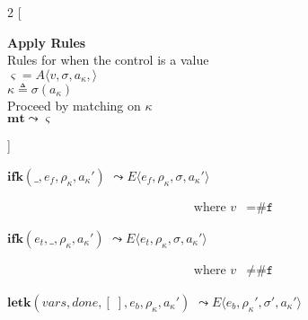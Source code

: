 \documentclass[12pt,draft]{article}
\newcommand{\falsesyn}{\texttt{\#f}}
\newcommand{\env}[0]{\rho}
\newcommand{\store}[0]{\sigma}
\newcommand{\kaddr}[0]{a_{\kappa}}
\newcommand{\kont}[0]{\kappa}
\newcommand{\state}[0]{\varsigma}
\newcommand{\E}[4]{E\langle #1 , #2 , #3 , #4 \rangle}
\newcommand{\A}[4]{A\langle #1 , #2 , #3 , #4 \rangle}
\begin{document}
\newpage

\newcommand{\kenv}[0]{\env_{\kappa}}
\newcommand{\lamenv}[0]{\env_{\lambda}}

\begin{multicols*}{2}
[
\begin{center}
\textbf{Apply Rules} \\
Rules for when the control is a value \\
$\state = \A{v}{\store}{\kaddr}{}$ \\
$\kont \triangleq \store(\kaddr)$ \\
Proceed by matching on $\kont$ \\
\vspace{5mm}
$\textbf{mt} \leadsto \state$
\end{center}
\vspace{-5mm}
]
\begin{center}
  $\textbf{ifk}(\_ , e_f , \kenv , \kaddr')$
  $\leadsto \E{e_f}{\kenv}{\store}{\kaddr'}$
\end{center}
\vspace{-7mm}
\begin{align*}
\text{where } v &= \falsesyn
\end{align*}
\begin{center}
  $\textbf{ifk}(e_t , \_ , \kenv, \kaddr')$
  $\leadsto \E{e_t}{\kenv}{\store}{\kaddr'}$
\end{center}
\vspace{-7mm}
\begin{align*}
\text{where } v &\not= \falsesyn
\end{align*}
\begin{center}
  $\textbf{letk}(vars , done , [\;] , e_b , \kenv , \kaddr')$
  $\leadsto \E{e_b}{\kenv'}{\store'}{\kaddr'}$
\end{center}
\vspace{-7mm}
\begin{align*}

\end{align*}
\end{multicols*}
\end{document}
